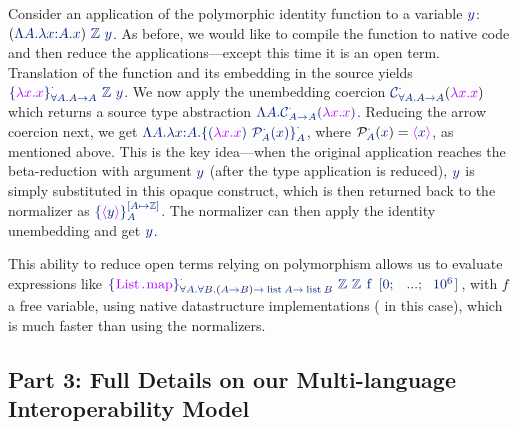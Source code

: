 Consider an application of the polymorphic identity function to a
variable $\svar{y}$:
$\sapp{\stapp{(\stabs{\svar{A}}{\sabs{\svar{x}}{\svar{A}}{\svar{x}}})}{\source{\mathbb{Z}}}}{\svar{y}}$.
As before, we would like to compile the function to native code and
then reduce the applications---except this time it is an open term.
%
Translation of the function and its embedding in the source yields
$\sapp{\stapp{\salien{\tabs{\tvar{x}}{\tvar{x}}}{\sall{\svar{A}}{\sarrow{\svar{A}}{\svar{A}}}}{\sesubstemp}}{\source{\mathbb{Z}}}}{\svar{y}}$.
%
We now apply the unembedding coercion
$\scoerce{\sall{\svar{A}}{\sarrow{\svar{A}}{\svar{A}}}}{\sesubstemp}{\tabs{\tvar{x}}{\tvar{x}}}$
which returns \linebreak a source type abstraction
$\stabs{\svar{A}}{\scoerce{\sarrow{\svar{A}}{\svar{A}}}{\sesubstemp}{\tabs{\tvar{x}}{\tvar{x}}}}$.
%
Reducing the arrow coercion next, we get
$\stabs{\svar{A}}{\sabs{\svar{x}}{\svar{A}}{\salien{\tapp{(\tabs{\tvar{x}}{\tvar{x}})}{\prot{\svar{x}}{\svar{A}}{\sesubstemp}}}{\svar{A}}{\sesubstemp}}}$,
%
where $\prot{\svar{x}}{\svar{A}}{\sesubstemp} = \topaque{\svar{x}}$, as mentioned above.
This is the key idea---when the original application reaches the beta-reduction with
argument $\svar{y}$ (after the type application is reduced), $\svar{y}$ is simply substituted
in this opaque construct, which is then returned back to the \fstar normalizer as
$\salien{\topaque{\svar{y}}}{\svar{A}}{\sesubstsingl{\svar{A}}{\source{\mathbb{Z}}}}$.
%
The normalizer can then apply the identity unembedding and get $\svar{y}$.

This ability to reduce open terms relying on polymorphism allows us to
evaluate expressions like
$\sapp{\sapp{\stapp{\stapp{\salien{\target{\text{\ls{List.map}}}}{\sall{\svar{A}}{\sall{\svar{B}}{\sarrow{\sarrow{(\sarrow{\svar{A}}{\svar{B}})}{\source{\text{\ls{list}}} \svar{A}}}{\source{\text{\ls{list}}} \svar{B}}}}}{\sesubstemp}}{\source{\mathbb{Z}}}}{\source{\mathbb{Z}}}}{\source{\text{\ls{f}}}}}{\source{\text{\ls{[0; ...; 10}$^6$\ls{]}}}}$,
with \ls$f$ a free variable,
using native datastructure implementations ( in this case), 
which is much faster than using the normalizers.

\subsection*{Part 3: Full Details on our Multi-language Interoperability Model}


